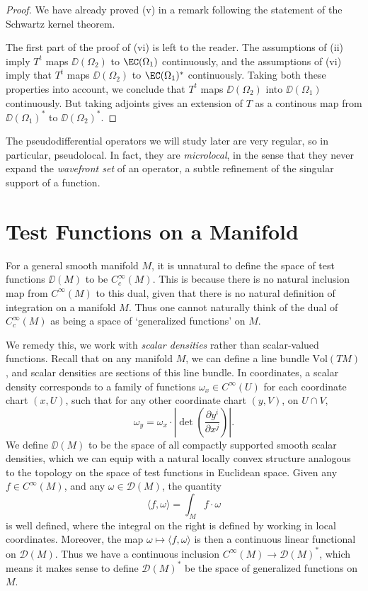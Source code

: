 \begin{proof}
    We have already proved (v) in a remark following the statement of the Schwartz kernel theorem.

    The first part of the proof of (vi) is left to the reader. The assumptions of (ii) imply $T^t$ maps $\DD(\Omega_2)$ to $\EC(\Omega_1)$ continuously, and the assumptions of (vi) imply that $T^t$ maps $\DD(\Omega_2)$ to $\EC(\Omega_1)^*$ continuously. Taking both these properties into account, we conclude that $T^t$ maps $\DD(\Omega_2)$ into $\DD(\Omega_1)$ continuously. But taking adjoints gives an extension of $T$ as a continous map from $\DD(\Omega_1)^*$ to $\DD(\Omega_2)^*$.
\end{proof}
%
The pseudodifferential operators we will study later are very regular, so in particular, pseudolocal. In fact, they are \emph{microlocal}, in the sense that they never expand the \emph{wavefront set} of an operator, a subtle refinement of the singular support of a function.




\section{Test Functions on a Manifold}

For a general smooth manifold $M$, it is unnatural to define the space of test functions $\DD(M)$ to be $C_c^\infty(M)$. This is because there is no natural inclusion map from $C^\infty(M)$ to this dual, given that there is no natural definition of integration on a manifold $M$. Thus one cannot naturally think of the dual of $C_c^\infty(M)$ as being a space of `generalized functions' on $M$.

We remedy this, we work with \emph{scalar densities} rather than scalar-valued functions. Recall that on any manifold $M$, we can define a line bundle $\text{Vol}(TM)$, and scalar densities are sections of this line bundle. In coordinates, a scalar density corresponds to a family of functions $\omega_x \in C^\infty(U)$ for each coordinate chart $(x,U)$, such that for any other coordinate chart $(y,V)$, on $U \cap V$,
%
\[ \omega_y = \omega_x \cdot \left| \det \left( \frac{\partial y^i}{\partial x^j} \right) \right|. \]
%
We define $\DD(M)$ to be the space of all compactly supported smooth scalar densities, which we can equip with a natural locally convex structure analogous to the topology on the space of test functions in Euclidean space. Given any $f \in C^\infty(M)$, and any $\omega \in \mathcal{D}(M)$, the quantity
%
\[ \langle f, \omega \rangle = \int_M f \cdot \omega \]
%
is well defined, where the integral on the right is defined by working in local coordinates. Moreover, the map $\omega \mapsto \langle f, \omega \rangle$ is then a continuous linear functional on $\mathcal{D}(M)$. Thus we have a continuous inclusion $C^\infty(M) \to \mathcal{D}(M)^*$, which means it makes sense to define $\mathcal{D}(M)^*$ be the space of generalized functions on $M$.

